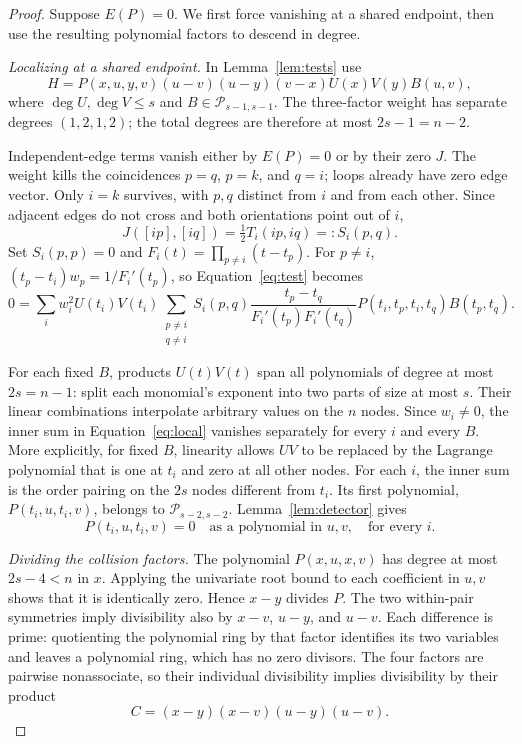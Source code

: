 \documentclass[11pt,a4paper]{article}
\theoremstyle{remark}
\numberwithin{equation}{section}
\newcommand{\PP}{\mathcal P}
\begin{document}
\begin{proof}
Suppose \(E(P)=0\). We first force vanishing at a shared endpoint,
then use the resulting polynomial factors to descend in degree.

\emph{Localizing at a shared endpoint.} In Lemma~\ref{lem:tests} use
\begin{equation}\label{eq:localtest}
H=P(x,u,y,v)(u-v)(u-y)(v-x)U(x)V(y)B(u,v),
\end{equation}
where \(\deg U,\deg V\le s\) and \(B\in\PP_{s-1,s-1}\).
The three-factor weight has separate degrees \((1,2,1,2)\);
the total degrees are therefore at most \(2s-1=n-2\).

Independent-edge terms vanish either by \(E(P)=0\) or by their
zero \(J\). The weight kills the coincidences \(p=q\), \(p=k\),
and \(q=i\); loops already have zero edge vector. Only \(i=k\)
survives, with \(p,q\) distinct from \(i\) and from each other.
Since adjacent edges do not cross and both orientations point out
of \(i\),
\[
J([ip],[iq])=\tfrac12 T_i(ip,iq)=:S_i(p,q).
\]
Set \(S_i(p,p)=0\) and \(F_i(t)=\prod_{p\ne i}(t-t_p)\).
For \(p\ne i\),
\((t_p-t_i)w_p=1/F_i'(t_p)\), so Equation~\eqref{eq:test} becomes
\begin{equation}\label{eq:local}
0=\sum_i w_i^2U(t_i)V(t_i)
\sum_{\substack{p\ne i\\q\ne i}}
S_i(p,q)\frac{t_p-t_q}{F_i'(t_p)F_i'(t_q)}
P(t_i,t_p,t_i,t_q)B(t_p,t_q).
\end{equation}

For each fixed \(B\), products \(U(t)V(t)\) span all polynomials
of degree at most \(2s=n-1\): split each monomial's exponent
into two parts of size at most \(s\). Their linear combinations
interpolate arbitrary values on the \(n\) nodes. Since \(w_i\ne0\),
the inner sum in Equation~\eqref{eq:local} vanishes separately
for every \(i\) and every \(B\). More explicitly, for fixed \(B\),
linearity allows \(U V\) to be replaced by the Lagrange polynomial
that is one at \(t_i\) and zero at all other nodes. For each \(i\),
the inner sum is the order pairing on the \(2s\) nodes different
from \(t_i\). Its first polynomial,
\(P(t_i,u,t_i,v)\), belongs to \(\PP_{s-2,s-2}\).
Lemma~\ref{lem:detector} gives
\[
P(t_i,u,t_i,v)=0
\quad\text{as a polynomial in }u,v,\quad\text{for every }i.
\]

\emph{Dividing the collision factors.} The polynomial \(P(x,u,x,v)\)
has degree at most \(2s-4<n\) in \(x\).
Applying the univariate root bound to each coefficient in \(u,v\)
shows that it is identically zero. Hence \(x-y\) divides \(P\).
The two within-pair symmetries imply divisibility also by
\(x-v\), \(u-y\), and \(u-v\). Each difference is prime: quotienting
the polynomial ring by that factor identifies its two variables
and leaves a polynomial ring,
which has no zero divisors. The four factors are pairwise nonassociate,
so their individual divisibility implies divisibility by their product
\begin{equation}\label{eq:C}
C=(x-y)(x-v)(u-y)(u-v).
\end{equation}


\end{proof}
\end{document}

